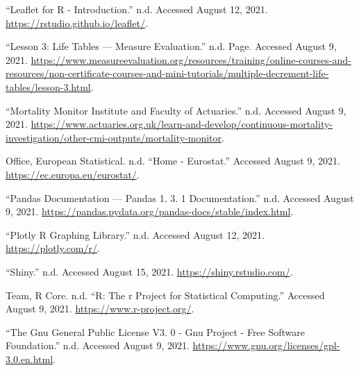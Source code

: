 \documentclass[
  a4paper]{article}
\newlength{\cslhangindent}
\newenvironment{CSLReferences}[2] %
 {%
  \setlength{\parindent}{0pt}
  \ifodd #1 \everypar{\setlength{\hangindent}{\cslhangindent}}\ignorespaces\fi
  \ifnum #2 > 0
  \setlength{\parskip}{#2\baselineskip}
  \fi
 }%
 {}
\begin{document}
\begin{CSLReferences}{1}{0}
\leavevmode{}%
{``Leaflet for {R} - {Introduction}.''} n.d. Accessed August 12, 2021.
\url{https://rstudio.github.io/leaflet/}.

\leavevmode{}%
{``Lesson 3: Life Tables --- Measure Evaluation.''} n.d. Page. Accessed
August 9, 2021.
\url{https://www.measureevaluation.org/resources/training/online-courses-and-resources/non-certificate-courses-and-mini-tutorials/multiple-decrement-life-tables/lesson-3.html}.

\leavevmode{}%
{``Mortality Monitor {\textbar} Institute and Faculty of Actuaries.''}
n.d. Accessed August 9, 2021.
\url{https://www.actuaries.org.uk/learn-and-develop/continuous-mortality-investigation/other-cmi-outputs/mortality-monitor}.

\leavevmode{}%
Office, European Statistical. n.d. {``Home - Eurostat.''} Accessed
August 9, 2021. \url{https://ec.europa.eu/eurostat/}.

\leavevmode{}%
{``Pandas Documentation --- Pandas 1. 3. 1 Documentation.''} n.d.
Accessed August 9, 2021.
\url{https://pandas.pydata.org/pandas-docs/stable/index.html}.

\leavevmode{}%
{``Plotly {R} {Graphing} {Library}.''} n.d. Accessed August 12, 2021.
\url{https://plotly.com/r/}.

\leavevmode{}%
{``Shiny.''} n.d. Accessed August 15, 2021.
\url{https://shiny.rstudio.com/}.

\leavevmode{}%
Team, R Core. n.d. {``R: The r Project for Statistical Computing.''}
Accessed August 9, 2021. \url{https://www.r-project.org/}.

\leavevmode{}%
{``The Gnu General Public License V3. 0 - Gnu Project - Free Software
Foundation.''} n.d. Accessed August 9, 2021.
\url{https://www.gnu.org/licenses/gpl-3.0.en.html}.

\end{CSLReferences}
\end{document}
